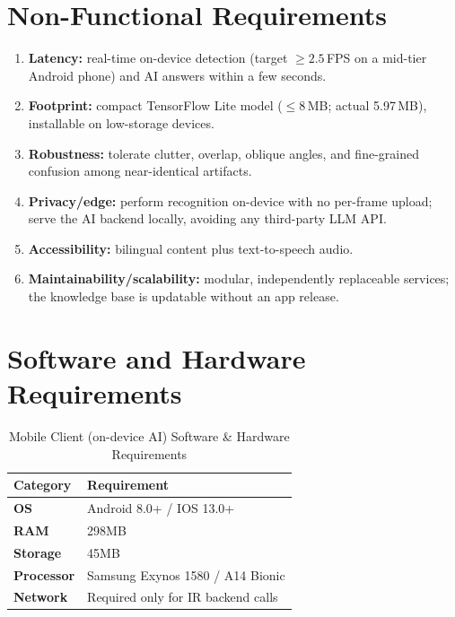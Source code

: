 \section{Non-Functional Requirements}

\begin{enumerate}[label=\textbf{NFR-\arabic*.},leftmargin=3.4em]
  \item \textbf{Latency:} real-time on-device detection (target $\geq 2.5$\,FPS
        on a mid-tier Android phone) and AI answers within a few seconds.
  \item \textbf{Footprint:} compact TensorFlow Lite model ($\leq 8$\,MB; actual
        5.97\,MB), installable on low-storage devices.
  \item \textbf{Robustness:} tolerate clutter, overlap, oblique angles, and
        fine-grained confusion among near-identical artifacts.
  \item \textbf{Privacy/edge:} perform recognition on-device with no per-frame
        upload; serve the AI backend locally, avoiding any third-party LLM API.
  \item \textbf{Accessibility:} bilingual content plus text-to-speech audio.
  \item \textbf{Maintainability/scalability:} modular, independently replaceable
        services; the knowledge base is updatable without an app release.
\end{enumerate}

\section{Software and Hardware Requirements}

\begin{table}[htbp]
    \centering
    \caption{Mobile Client (on-device AI) Software \& Hardware Requirements}
    \label{tab:req-mobile}
    \renewcommand{\arraystretch}{1.3}
    \begin{tabular}{>{\bfseries}p{3.5cm} p{8.5cm}}
        \toprule
        \rowcolor{gemsand}
        \textbf{Category} & \textbf{Requirement} \\
        \midrule
        OS
            & Android 8.0+ / IOS 13.0+ \\
        RAM
            & 298MB \\
        Storage
            & 45MB \\
        Processor
            & Samsung Exynos 1580 / A14 Bionic \\
        Network
            & Required only for IR backend calls \\
        \bottomrule
    \end{tabular}
\end{table}

